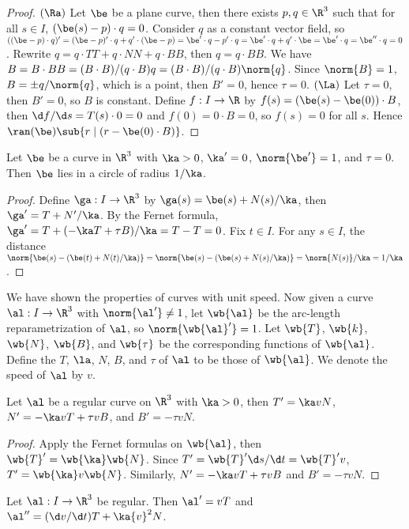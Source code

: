 \documentclass[10pt]{article}
\begin{document}
\begin{proof}
    $(\Ra)$ Let $\be$ be a plane curve, then there exists $p,q\in{\R}^{3}$ such that for all $s\in I$, $(\be(s)-p)\cdot q=0$. Consider $q$ as a constant vector field, so $((\be-p)\cdot q)'=(\be-p)'\cdot q+q'\cdot(\be-p)=\be'\cdot q-p'\cdot q=\be'\cdot q+q'\cdot\be=\be'\cdot q=\be''\cdot q=0$. Rewrite $q=q\cdot TT+q\cdot NN+q\cdot BB$, then $q=q\cdot BB$. We have $B=B\cdot BB=(B\cdot B)/(q\cdot B)q=(B\cdot B)/(q\cdot B)\norm{q}$. Since $\norm{B}=1$, $B=\pm q/\norm{q}$, which is a point, then $B'=0$, hence $\tau=0$. $(\La)$ Let $\tau=0$, then $B'=0$, so $B$ is constant. Define $f:I\to\R$ by $f(s)=(\be(s)-\be(0))\cdot B$, then $\d f/\d s=T(s)\cdot 0=0$ and $f(0)=0\cdot B=0$, so $f(s)=0$ for all $s$. Hence $\ran(\be)\sub\{r\mid(r-\be(0)\cdot B)\}$.
\end{proof}
\begin{proposition}
    Let $\be$ be a curve in ${\R}^{3}$ with $\ka>0$, $\ka'=0$, $\norm{\be'}=1$, and $\tau=0$. Then $\be$ lies in a circle of radius $1/\ka$.
\end{proposition}
\begin{proof}
    Define $\ga:I\to{\R}^{3}$ by $\ga(s)=\be(s)+N(s)/\ka$, then $\ga'=T+N'/\ka$. By the Fernet formula, $\ga'=T+(-\ka T+\tau B)/\ka=T-T=0$. Fix $t\in I$. For any $s\in I$, the distance $\norm{\be(s)-(\be(t)+N(t)/\ka)}=\norm{\be(s)-(\be(s)+N(s)/\ka)}=\norm{N(s)}/\ka=1/\ka$.
\end{proof}
\par
We have shown the properties of curves with unit speed. Now given a curve $\al:I\to{\R}^{3}$ with $\norm{\al'}\ne 1$, let $\wb{\al}$ be the arc-length reparametrization of $\al$, so $\norm{\wb{\al}'}=1$. Let $\wb{T}$, $\wb{k}$, $\wb{N}$, $\wb{B}$, and $\wb{\tau}$ be the corresponding functions of $\wb{\al}$. Define the $T$, $\la$, $N$, $B$, and $\tau$ of $\al$ to be those of $\wb{\al}$. We denote the speed of $\al$ by $v$.
\begin{theorem}
    Let $\al$ be a regular curve on ${\R}^{3}$ with $\ka>0$, then $T'=\ka vN$, $N'=-\ka vT+\tau vB$, and $B'=-\tau vN$.
\end{theorem}
\begin{proof}
    Apply the Fernet formulas on $\wb{\al}$, then $\wb{T}'=\wb{\ka}\wb{N}$. Since $T'=\wb{T}'\d s/\d t=\wb{T}'v$, $T'=\wb{\ka}v\wb{N}$. Similarly, $N'=-\ka vT+\tau vB$ and $B'=-\tau vN$.
\end{proof}
\begin{proposition}
    Let $\al:I\to{\R}^{3}$ be regular. Then $\al'=vT$ and $\al''=(\d v/\d t)T+\ka{v}^{2}N$.
\end{proposition}
\end{document}
